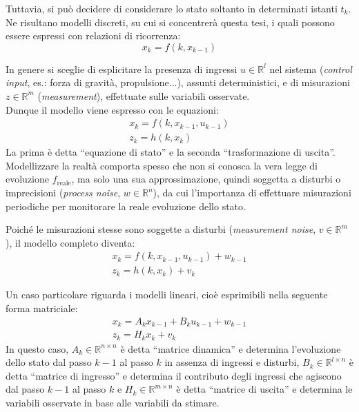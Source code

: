 \documentclass[12pt,a4paper,openright,twoside]{book}
\begin{document}
Tuttavia, si può decidere di considerare lo stato soltanto in determinati istanti $t_k$. Ne risultano modelli discreti, su cui si concentrerà questa tesi, i quali possono essere espressi con relazioni di ricorrenza:
$$x_k=f(k,x_{k-1})$$

In genere si sceglie di esplicitare la presenza di ingressi $u\in\mathbb{R}^l$ nel sistema (\textit{control input}, es.: forza di gravità, propulsione...), assunti deterministici, e di misurazioni $z\in\mathbb{R}^m$ (\textit{measurement}), effettuate sulle variabili osservate. \\
Dunque il modello viene espresso con le equazioni:
\begin{gather*}
x_k=f(k,x_{k-1},u_{k-1}) \\
z_k=h(k,x_k)
\end{gather*}
La prima è detta ``equazione di stato'' e la seconda ``trasformazione di uscita''. \\

Modellizzare la realtà comporta spesso che non si conosca la vera legge di evoluzione $f_\text{reale}$, ma solo una sua approssimazione, quindi soggetta a disturbi o imprecisioni (\textit{process noise}, $w\in\mathbb{R}^n$), da cui l'importanza di effettuare misurazioni periodiche per monitorare la reale evoluzione dello stato.

Poiché le misurazioni stesse sono soggette a disturbi (\textit{measurement noise}, $v\in\mathbb{R}^m$), il modello completo diventa:
\begin{gather}
x_k=f(k,x_{k-1},u_{k-1})+w_{k-1}\label{eq:fdet} \\
z_k=h(k,x_k)+v_k\label{eq:hdet}
\end{gather}

Un caso particolare riguarda i modelli lineari, cioè esprimibili nella seguente forma matriciale:
\begin{gather}
x_k=A_kx_{k-1}+B_ku_{k-1}+w_{k-1} \label{eq:transition}\\
z_k=H_kx_k+v_k \label{eq:output}
\end{gather}
In questo caso, $A_k\in\mathbb{R}^{n\times n}$ è detta ``matrice dinamica'' e determina l'evoluzione dello stato dal passo $k-1$ al passo $k$ in assenza di ingressi e disturbi, $B_k\in\mathbb{R}^{l\times n}$ è detta ``matrice di ingresso'' e determina il contributo degli ingressi che agiscono dal passo $k-1$ al passo $k$ e $H_k\in\mathbb{R}^{m\times n}$ è detta ``matrice di uscita'' e determina le variabili osservate in base alle variabili da stimare. \\
\end{document}
